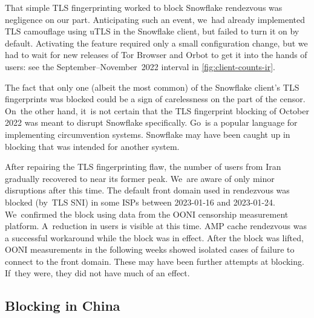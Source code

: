 \documentclass[letterpaper,twocolumn]{article}
\begin{document}
That simple TLS fingerprinting worked to block Snowflake rendezvous
was negligence on our part.
Anticipating such an event,
we~had already implemented TLS camouflage using uTLS
in the Snowflake client,
but failed to turn it on by default.
Activating the feature required only a small configuration change,
but we had to wait for new releases of Tor Browser and Orbot
to get it into the hands of users:
see the September--November~2022 interval in \autoref{fig:client-counts-ir}.

The fact that only one (albeit the most common)
of the Snowflake client's TLS fingerprints was blocked
could be a sign of carelessness on the part of the censor.
On~the other hand, it~is not certain that the TLS fingerprint blocking of October 2022
was meant to disrupt Snowflake specifically.
Go~is a popular language for implementing circumvention systems.
Snowflake may have been caught up in blocking that was intended for another system.


After repairing the TLS fingerprinting flaw,
the number of users from Iran gradually recovered
to near its former peak.
We~are aware of only minor disruptions after this time.
The default front domain used in rendezvous
was blocked (by~TLS SNI) in some ISPs
between \mbox{2023-01-16} and \mbox{2023-01-24}.
We~confirmed the block using data from the OONI
censorship measurement platform.
A~reduction in users is visible at this time.
AMP cache rendezvous was a successful workaround while the block was in effect.
After the block was lifted,
OONI measurements in the following weeks showed isolated cases
of failure to connect to the front domain.
These may have been further attempts at blocking.
If~they were, they did not have much of an effect.

\subsection{Blocking in China}
\label{sec:block-cn}

\end{document}
